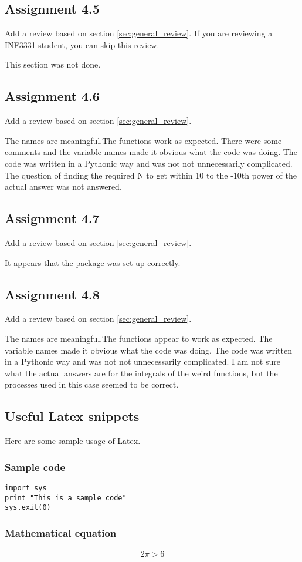\documentclass[a4paper]{article}
\begin{document}
\subsection*{Assignment 4.5}
Add a review based on section \ref{sec:general_review}. If you are reviewing a INF3331 student, you can skip this review.
\bigskip

This section was not done.

\subsection*{Assignment 4.6}
Add a review based on section \ref{sec:general_review}.
\bigskip

The names are meaningful.The functions work as expected. There were some comments and the variable names made it obvious what the code was doing. The code was written in a Pythonic way and was not not unnecessarily complicated. The question of finding the required N to get within 10 to the -10th power of the actual answer was not answered.
\subsection*{Assignment 4.7}
Add a review based on section \ref{sec:general_review}.
\bigskip

It appears that the package was set up correctly.
\subsection*{Assignment 4.8}
Add a review based on section \ref{sec:general_review}.
\bigskip

The names are meaningful.The functions appear to work as expected. The variable names made it obvious what the code was doing. The code was written in a Pythonic way and was not not unnecessarily complicated. I am not sure what the actual answers are for the integrals  of the weird functions, but the processes used in this case seemed to be correct.



\subsection{Useful Latex snippets}
Here are some sample usage of Latex.

\subsubsection{Sample code}
\begin{verbatim}
import sys
print "This is a sample code"
sys.exit(0)
\end{verbatim}

\subsubsection{Mathematical equation}
\begin{align}
2 \pi > 6
\end{align}





\end{document}
